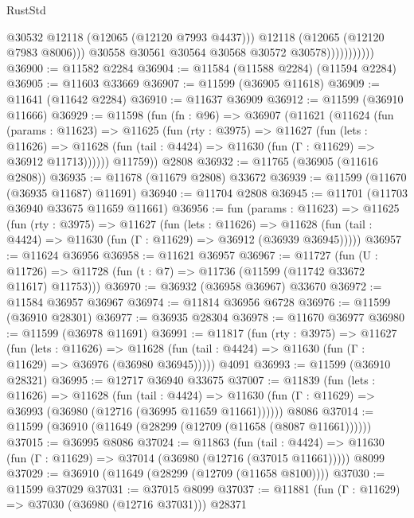 \begin{lexlean}{RustStd}
\begin{coremodule}
                              @30532
                              @12118
                              (@12065 (@12120 @7993 @4437)))
                            @12118
                            (@12065 (@12120 @7983 @8006)))
                          @30558
                          @30561
                          @30564
                          @30568
                          @30572
                          @30578)))))))))))
@36900 := @11582 @2284
@36904 := @11584 (@11588 @2284) (@11594 @2284)
@36905 := @11603 @33669
@36907 := @11599 (@36905 @11618)
@36909 := @11641 (@11642 @2284)
@36910 := @11637 @36909
@36912 := @11599 (@36910 @11666)
@36929 := @11598
    (fun (fn : @96) =>
    @36907
      (@11621
        (@11624
          (fun (params : @11623) =>
          @11625
            (fun (rty : @3975) =>
            @11627
              (fun (lets : @11626) =>
              @11628 (fun (tail : @4424) => @11630 (fun (Γ : @11629) => @36912 @11713))))))
        @11759))
    @2808
@36932 := @11765 (@36905 (@11616 @2808))
@36935 := @11678 (@11679 @2808) @33672
@36939 := @11599 (@11670 (@36935 @11687) @11691)
@36940 := @11704 @2808
@36945 := @11701 (@11703 @36940 @33675 @11659 @11661)
@36956 := fun (params : @11623) =>
  @11625
    (fun (rty : @3975) =>
    @11627
      (fun (lets : @11626) =>
      @11628 (fun (tail : @4424) => @11630 (fun (Γ : @11629) => @36912 (@36939 @36945)))))
@36957 := @11624 @36956
@36958 := @11621 @36957
@36967 := @11727
    (fun (U : @11726) => @11728 (fun (t : @7) => @11736 (@11599 (@11742 @33672 @11617) @11753)))
@36970 := @36932 (@36958 @36967) @33670
@36972 := @11584 @36957 @36967
@36974 := @11814 @36956 @6728
@36976 := @11599 (@36910 @28301)
@36977 := @36935 @28304
@36978 := @11670 @36977
@36980 := @11599 (@36978 @11691)
@36991 := @11817
    (fun (rty : @3975) =>
    @11627
      (fun (lets : @11626) =>
      @11628 (fun (tail : @4424) => @11630 (fun (Γ : @11629) => @36976 (@36980 @36945)))))
    @4091
@36993 := @11599 (@36910 @28321)
@36995 := @12717 @36940 @33675
@37007 := @11839
    (fun (lets : @11626) =>
    @11628
      (fun (tail : @4424) =>
      @11630 (fun (Γ : @11629) => @36993 (@36980 (@12716 (@36995 @11659 @11661))))))
    @8086
@37014 := @11599 (@36910 (@11649 (@28299 (@12709 (@11658 (@8087 @11661))))))
@37015 := @36995 @8086
@37024 := @11863
    (fun (tail : @4424) => @11630 (fun (Γ : @11629) => @37014 (@36980 (@12716 (@37015 @11661)))))
    @8099
@37029 := @36910 (@11649 (@28299 (@12709 (@11658 @8100))))
@37030 := @11599 @37029
@37031 := @37015 @8099
@37037 := @11881 (fun (Γ : @11629) => @37030 (@36980 (@12716 @37031))) @28371

\end{coremodule}
\end{lexlean}
